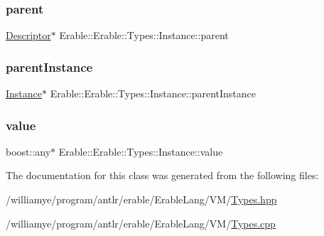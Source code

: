 \subsubsection{\texorpdfstring{parent}{parent}}
{\footnotesize\ttfamily \mbox{\hyperlink{class_erable_1_1_descriptor}{Descriptor}}$\ast$ Erable\+::\+Erable\+::\+Types\+::\+Instance\+::parent}

\mbox{\label{class_erable_1_1_erable_1_1_types_1_1_instance_a785d3c2a59f2f4981696d9728130573c}} 
\subsubsection{\texorpdfstring{parentInstance}{parentInstance}}
{\footnotesize\ttfamily \mbox{\hyperlink{class_erable_1_1_erable_1_1_types_1_1_instance}{Instance}}$\ast$ Erable\+::\+Erable\+::\+Types\+::\+Instance\+::parent\+Instance}

\mbox{\label{class_erable_1_1_erable_1_1_types_1_1_instance_a6f7a9514f61ceb2d8c22647fe3833ec3}} 
\subsubsection{\texorpdfstring{value}{value}}
{\footnotesize\ttfamily boost\+::any$\ast$ Erable\+::\+Erable\+::\+Types\+::\+Instance\+::value}



The documentation for this class was generated from the following files\+:\begin{DoxyCompactItemize}
\item 
/williamye/program/antlr/erable/\+Erable\+Lang/\+V\+M/\mbox{\hyperlink{_types_8hpp}{Types.\+hpp}}\item 
/williamye/program/antlr/erable/\+Erable\+Lang/\+V\+M/\mbox{\hyperlink{_types_8cpp}{Types.\+cpp}}\end{DoxyCompactItemize}
